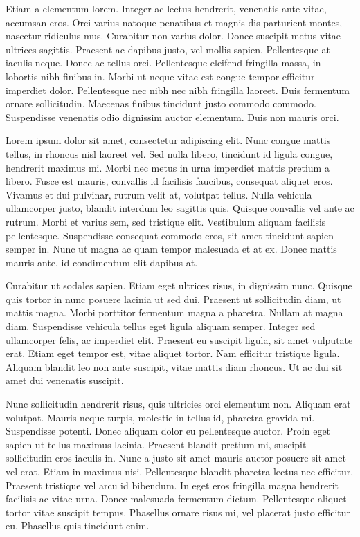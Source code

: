 \documentclass[a4paper,12pt,twoside]{ThesisStyle}
\begin{document}
\begin{appendices}
Etiam a elementum lorem. Integer ac lectus hendrerit, venenatis ante vitae, accumsan eros. Orci varius natoque penatibus et magnis dis parturient montes, nascetur ridiculus mus. Curabitur non varius dolor. Donec suscipit metus vitae ultrices sagittis. Praesent ac dapibus justo, vel mollis sapien. Pellentesque at iaculis neque. Donec ac tellus orci. Pellentesque eleifend fringilla massa, in lobortis nibh finibus in. Morbi ut neque vitae est congue tempor efficitur imperdiet dolor. Pellentesque nec nibh nec nibh fringilla laoreet. Duis fermentum ornare sollicitudin. Maecenas finibus tincidunt justo commodo commodo. Suspendisse venenatis odio dignissim auctor elementum. Duis non mauris orci.

Lorem ipsum dolor sit amet, consectetur adipiscing elit. Nunc congue mattis tellus, in rhoncus nisl laoreet vel. Sed nulla libero, tincidunt id ligula congue, hendrerit maximus mi. Morbi nec metus in urna imperdiet mattis pretium a libero. Fusce est mauris, convallis id facilisis faucibus, consequat aliquet eros. Vivamus et dui pulvinar, rutrum velit at, volutpat tellus. Nulla vehicula ullamcorper justo, blandit interdum leo sagittis quis. Quisque convallis vel ante ac rutrum. Morbi et varius sem, sed tristique elit. Vestibulum aliquam facilisis pellentesque. Suspendisse consequat commodo eros, sit amet tincidunt sapien semper in. Nunc ut magna ac quam tempor malesuada et at ex. Donec mattis mauris ante, id condimentum elit dapibus at.

Curabitur ut sodales sapien. Etiam eget ultrices risus, in dignissim nunc. Quisque quis tortor in nunc posuere lacinia ut sed dui. Praesent ut sollicitudin diam, ut mattis magna. Morbi porttitor fermentum magna a pharetra. Nullam at magna diam. Suspendisse vehicula tellus eget ligula aliquam semper. Integer sed ullamcorper felis, ac imperdiet elit. Praesent eu suscipit ligula, sit amet vulputate erat. Etiam eget tempor est, vitae aliquet tortor. Nam efficitur tristique ligula. Aliquam blandit leo non ante suscipit, vitae mattis diam rhoncus. Ut ac dui sit amet dui venenatis suscipit.

Nunc sollicitudin hendrerit risus, quis ultricies orci elementum non. Aliquam erat volutpat. Mauris neque turpis, molestie in tellus id, pharetra gravida mi. Suspendisse potenti. Donec aliquam dolor eu pellentesque auctor. Proin eget sapien ut tellus maximus lacinia. Praesent blandit pretium mi, suscipit sollicitudin eros iaculis in. Nunc a justo sit amet mauris auctor posuere sit amet vel erat. Etiam in maximus nisi. Pellentesque blandit pharetra lectus nec efficitur. Praesent tristique vel arcu id bibendum. In eget eros fringilla magna hendrerit facilisis ac vitae urna. Donec malesuada fermentum dictum. Pellentesque aliquet tortor vitae suscipit tempus. Phasellus ornare risus mi, vel placerat justo efficitur eu. Phasellus quis tincidunt enim.


\end{appendices}
\end{document}
